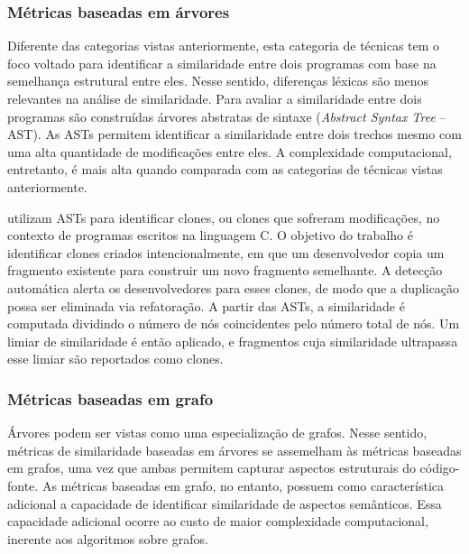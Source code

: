 \subsubsection{Métricas baseadas em árvores}

Diferente das categorias vistas anteriormente, esta categoria de técnicas tem o foco voltado para identificar a similaridade entre dois programas com base na semelhança estrutural entre eles. Nesse sentido, diferenças léxicas são menos relevantes na análise de similaridade. Para avaliar a similaridade entre dois programas são construídas árvores abstratas de sintaxe (\textit{Abstract Syntax Tree} -- AST). As ASTs permitem identificar a similaridade entre dois trechos mesmo com uma alta quantidade de modificações entre eles. A complexidade computacional, entretanto, é mais alta quando comparada com as categorias de técnicas vistas anteriormente.

 utilizam ASTs para identificar clones, ou clones que sofreram modificações, no contexto de programas escritos na linguagem C. O objetivo do trabalho é identificar clones criados intencionalmente, em que um desenvolvedor copia um fragmento existente para construir um novo fragmento semelhante. A detecção automática alerta os desenvolvedores para esses clones, de modo que a duplicação possa ser eliminada via refatoração. A partir das ASTs, a similaridade é computada dividindo o número de nós coincidentes pelo número total de nós. Um limiar de similaridade é então aplicado, e fragmentos cuja similaridade ultrapassa esse limiar são reportados como clones.

\subsubsection{Métricas baseadas em grafo}

Árvores podem ser vistas como uma especialização de grafos. Nesse sentido, métricas de similaridade baseadas em árvores se assemelham às métricas baseadas em grafos, uma vez que ambas permitem capturar aspectos estruturais do código-fonte. As métricas baseadas em grafo, no entanto, possuem como característica adicional a capacidade de identificar similaridade de aspectos semânticos. Essa capacidade adicional ocorre ao custo de maior complexidade computacional, inerente aos algoritmos sobre grafos.

